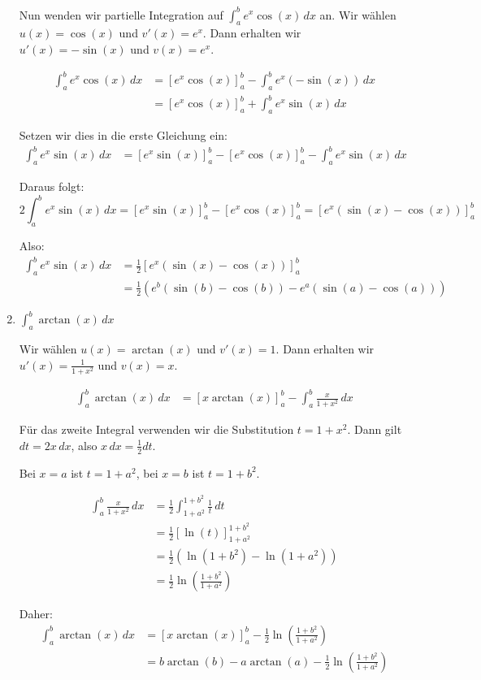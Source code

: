 \documentclass{article}
\begin{document}
\begin{enumerate}
Nun wenden wir partielle Integration auf $\int_a^b e^x\cos(x)\,dx$ an.
Wir wählen $u(x) = \cos(x)$ und $v'(x) = e^x$. Dann erhalten wir $u'(x) = -\sin(x)$ und $v(x) = e^x$.

\begin{align}
\int_a^b e^x\cos(x)\,dx &= [e^x\cos(x)]_a^b - \int_a^b e^x(-\sin(x))\,dx\\
&= [e^x\cos(x)]_a^b + \int_a^b e^x\sin(x)\,dx
\end{align}

Setzen wir dies in die erste Gleichung ein:
\begin{align}
\int_a^b e^x\sin(x)\,dx &= [e^x\sin(x)]_a^b - [e^x\cos(x)]_a^b - \int_a^b e^x\sin(x)\,dx
\end{align}

Daraus folgt:
$$2\int_a^b e^x\sin(x)\,dx = [e^x\sin(x)]_a^b - [e^x\cos(x)]_a^b = [e^x(\sin(x) - \cos(x))]_a^b$$

Also:
\begin{align}
\int_a^b e^x\sin(x)\,dx &= \frac{1}{2}[e^x(\sin(x) - \cos(x))]_a^b\\
&= \frac{1}{2}\left(e^b(\sin(b) - \cos(b)) - e^a(\sin(a) - \cos(a))\right)
\end{align}

\item $\int_a^b \arctan(x)\,dx$

Wir wählen $u(x) = \arctan(x)$ und $v'(x) = 1$. Dann erhalten wir $u'(x) = \frac{1}{1+x^2}$ und $v(x) = x$.

\begin{align}
\int_a^b \arctan(x)\,dx &= [x\arctan(x)]_a^b - \int_a^b \frac{x}{1+x^2}\,dx
\end{align}

Für das zweite Integral verwenden wir die Substitution $t = 1 + x^2$. Dann gilt $dt = 2x\,dx$, also $x\,dx = \frac{1}{2}dt$.

Bei $x = a$ ist $t = 1 + a^2$, bei $x = b$ ist $t = 1 + b^2$.

\begin{align}
\int_a^b \frac{x}{1+x^2}\,dx &= \frac{1}{2}\int_{1+a^2}^{1+b^2} \frac{1}{t}\,dt\\
&= \frac{1}{2}[\ln(t)]_{1+a^2}^{1+b^2}\\
&= \frac{1}{2}\left(\ln(1+b^2) - \ln(1+a^2)\right)\\
&= \frac{1}{2}\ln\left(\frac{1+b^2}{1+a^2}\right)
\end{align}

Daher:
\begin{align}
\int_a^b \arctan(x)\,dx &= [x\arctan(x)]_a^b - \frac{1}{2}\ln\left(\frac{1+b^2}{1+a^2}\right)\\
&= b\arctan(b) - a\arctan(a) - \frac{1}{2}\ln\left(\frac{1+b^2}{1+a^2}\right)
\end{align}

\end{enumerate}
\end{document}

